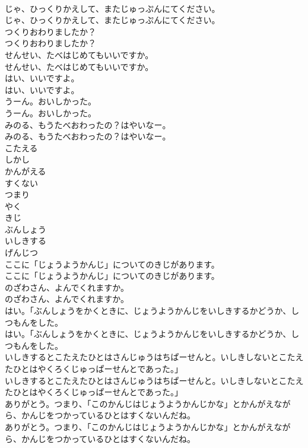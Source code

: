 \documentclass[8pt]{extreport}
\begin{document}
\begin{CJK}{UTF8}{min}
\\	じゃ、ひっくりかえして、またじゅっぷんにてください。
\\	じゃ、ひっくりかえして、またじゅっぷんにてください。
\\	つくりおわりましたか？
\\	つくりおわりましたか？
\\	せんせい、たべはじめてもいいですか。
\\	せんせい、たべはじめてもいいですか。
\\	はい、いいですよ。
\\	はい、いいですよ。
\\	うーん。おいしかった。
\\	うーん。おいしかった。
\\	みのる、もうたべおわったの？はやいなー。
\\	みのる、もうたべおわったの？はやいなー。
\\	こたえる
\\	しかし
\\	かんがえる
\\	すくない
\\	つまり
\\	やく
\\	きじ
\\	ぶんしょう
\\	いしきする
\\	げんじつ
\\	ここに「じょうようかんじ」についてのきじがあります。
\\	ここに「じょうようかんじ」についてのきじがあります。
\\	のざわさん、よんでくれますか。
\\	のざわさん、よんでくれますか。
\\	はい。「ぶんしょうをかくときに、じょうようかんじをいしきするかどうか、しつもんをした。
\\	はい。「ぶんしょうをかくときに、じょうようかんじをいしきするかどうか、しつもんをした。
\\	いしきするとこたえたひとはさんじゅうはちぱーせんと。いしきしないとこたえたひとはやくろくじゅっぱーせんとであった。」
\\	いしきするとこたえたひとはさんじゅうはちぱーせんと。いしきしないとこたえたひとはやくろくじゅっぱーせんとであった。」
\\	ありがとう。つまり、「このかんじはじょうようかんじかな」とかんがえながら、かんじをつかっているひとはすくないんだね。
\\	ありがとう。つまり、「このかんじはじょうようかんじかな」とかんがえながら、かんじをつかっているひとはすくないんだね。

\end{CJK}
\end{document}
